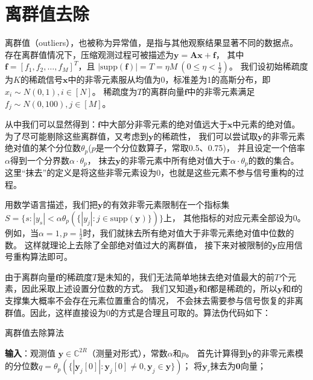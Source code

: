 \documentclass[AutoFakeBold]{LZUThesis}
\begin{document}
\section{离群值去除}
\label{removal}
离群值（outliers），也被称为异常值，是指与其他观察结果显著不同的数据点。
存在离群值情况下，压缩观测过程可被描述为$\mathbf{y} = \mathbf{Ax} + \mathbf{f}$，
其中$\mathbf{f} = [f_1, f_2, \dots, f_M]^T$，且
$\left | \mathrm{supp} (\mathbf{f}) \right | = T = \eta M \ (0 \leq \eta < \frac{1}{2})$。
我们设初始稀疏度为$K$的稀疏信号$\mathbf{x}$中的非零元素服从均值为0，标准差为1的高斯分布，即$x_i \sim N(0, 1), i \in [N]$。
稀疏度为$T$的离群向量$\mathbf{f}$中的非零元素满足$f_j \sim N(0, 100), j \in [M]$。

从中我们可以显然得到：$\mathbf{f}$中大部分非零元素的绝对值远大于$\mathbf{x}$中元素的绝对值。
为了尽可能剔除这些离群值，又考虑到$\mathbf{y}$的稀疏性，
我们可以尝试取$\mathbf{y}$的非零元素绝对值的某个分位数$\theta_p$($p$是一个分位数算子，常取0.5、0.75)，
并且设定一个倍率$\alpha$得到一个分界数$\alpha \cdot \theta_p$，
抹去$\mathbf{y}$的非零元素中所有绝对值大于$\alpha \cdot \theta_p$的数的集合。
这里“抹去”的定义是将这些非零元素设为0，也就是这些元素不参与信号重构的过程。

用数学语言描述，我们把$\mathbf{y}$的有效非零元素限制在一个指标集
$S = \{s: |y_s| < \alpha \theta_p (\{|y_j| : j \in \mathrm{supp} (\mathbf{y})\})\}$上，
其他指标的对应元素全部设为0。
例如，当$\alpha = 1, p = \frac{1}{2}$时，我们就抹去所有绝对值大于非零元素绝对值中位数的数。
这样就理论上去除了全部绝对值过大的离群值，
接下来对被限制的$\mathbf{y}$应用信号重构算法即可。

由于离群向量$\mathbf{f}$的稀疏度$T$是未知的，我们无法简单地抹去绝对值最大的前$T$个元素，因此采取上述设置分位数的方式。
我们又知道$\mathbf{y}$和$\mathbf{f}$都是稀疏的，所以$\mathbf{y}$和$\mathbf{f}$的支撑集大概率不会存在元素位置重合的情况，
不会抹去需要参与信号恢复的非离群值。因此，这样直接设为0的方式是合理且可取的。算法伪代码如下：

\begin{algorithm}[H]
    \caption{离群值去除算法\label{Alg:outliers_removal}}
    \begin{algorithmic}[1]
        \State \textbf{输入}：观测值 $\mathbf{y} \in \mathbb{C}^{2R}$（测量对形式），常数$\alpha$和$p$。
        \State 首先计算得到$\mathbf{y}$的非零元素模的分位数$q = \theta_p (\{|\mathbf{y}_j[0]|: \mathbf{y}_j[0] \neq 0, \mathbf{y}_j \in \mathbf{y}\})$；
                \State 将$\mathbf{y}_r$抹去为$\mathbf{0}$向量；
            \EndIf
        \EndFor
    \end{algorithmic}
\end{algorithm}
\end{document}
